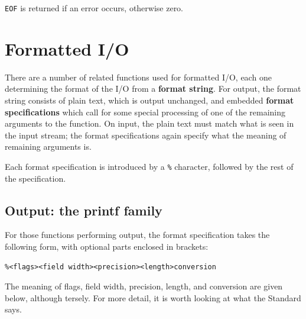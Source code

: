    \texttt{EOF} is returned if an error occurs, otherwise zero.


  

 
        \section{Formatted I/O}
        

  

  There are a number of related functions used for formatted I/O, each one
   determining the format of the I/O from a \textbf{format string}.  For
   output, the format string consists of plain text, which is output unchanged,
   and embedded \textbf{format specifications} which call for some special
   processing of one of the remaining arguments to the function.  On input, the
   plain text must match what is seen in the input stream; the format
   specifications again specify what the meaning of remaining arguments is.


  Each format specification is introduced by a \texttt{\%} character,
   followed by the rest of the specification.


  \subsection{Output: the printf family}
   

   For those functions performing output, the format
    specification takes the following form, with optional parts
    enclosed in brackets:


   \begin{Verbatim}
%<flags><field width><precision><length>conversion
\end{Verbatim}

   The meaning of flags, field width,
    precision,  length,  and conversion  are
    given  below,  although  tersely.  For more detail, it is worth looking at
    what the Standard says.


